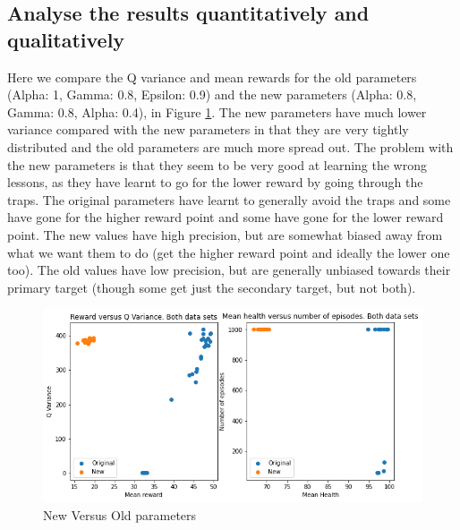 \documentclass[a4pape, 11pt, english]{article}
\begin{document}
\subsection{Analyse the results quantitatively and qualitatively}
Here we compare the Q variance and mean rewards for the old parameters (Alpha: 1, Gamma: 0.8, Epsilon: 0.9) and the new parameters (Alpha: 0.8, Gamma: 0.8, Alpha: 0.4), in Figure \ref{fig:bothData}. The new parameters have much lower variance compared with the new parameters in that they are very tightly distributed and the old parameters are much more spread out. The problem with the new parameters is that they seem to be very good at learning the wrong lessons, as they have learnt to go for the lower reward by going through the traps. The original parameters have learnt to generally avoid the traps and some have gone for the higher reward point and some have gone for the lower reward point. The new values have high precision, but are somewhat biased away from what we want them to do (get the higher reward point and ideally the lower one too). The old values have low precision, but are generally unbiased towards their primary target (though some get just the secondary target, but not both).



\begin{figure}[h!]
	\begin{center}
		\includegraphics[scale=0.8]{img/bothData.png}
		\caption{New Versus Old parameters}
		\label{fig:bothData}
	\end{center}
\end{figure}
\end{document}

